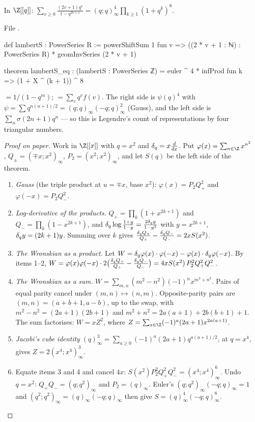 \begin{theorem}\label{l25:thm:legendre}
In $\Z[[q]]$: $\displaystyle\sum_{v\ge0}\frac{(2v+1)q^v}{1-q^{2v+1}}=(q;q)_\infty^4\prod_{k\ge1}(1+q^k)^8$.
\end{theorem}
\noindent File .
\begin{leancode}
def lambertS : PowerSeries R :=
  powerShiftSum 1 fun v => ((2 * v + 1 : ℕ) : PowerSeries R) * geomInvSeries (2 * v + 1)

theorem lambertS_eq :
    (lambertS : PowerSeries ℤ) = euler ^ 4 * infProd fun k => (1 + X ^ (k + 1)) ^ 8
\end{leancode}
\begin{dictionary}
 $=1/(1-q^m)$;  $=\sum_vq^vf(v)$. The right side is
$\psi(q)^4$ with $\psi=\sum q^{n(n+1)/2}=(q;q)_\infty(-q;q)_\infty^2$ (Gauss), and the left side is
$\sum_n\sigma(2n+1)q^n$ --- so this is Legendre's count of representations by four triangular numbers.
\end{dictionary}
\begin{proof}[Proof on paper]
Work in $\Z[[x]]$ with $q=x^2$ and $\delta_q=x\frac d{dx}$. Put $\varphi(x)=\sum_{n\in\Z}x^{n^2}$,
$Q_\pm=(\mp x;x^2)_\infty$, $P_2=(x^2;x^2)_\infty$, and let $S(q)$ be the left side of the theorem.
\begin{enumerate}
\item \emph{Gauss} (the triple product at $u=\mp x$, base $x^2$): $\varphi(x)=P_2Q_+^2$ and $\varphi(-x)=P_2Q_-^2$.
\item \emph{Log-derivative of the products.} $Q_+=\prod_k(1+x^{2k+1})$ and $Q_-=\prod_k(1-x^{2k+1})$, and
  $\delta_q\log\frac{1+y}{1-y}=\frac{2\delta_q y}{1-y^2}$ with $y=x^{2k+1}$, $\delta_q y=(2k+1)y$.
  Summing over $k$ gives $\frac{\delta_q Q_+}{Q_+}-\frac{\delta_q Q_-}{Q_-}=2xS(x^2)$.
\item \emph{The Wronskian as a product.} Let $W=\delta_q\varphi(x)\cdot\varphi(-x)-\varphi(x)\cdot\delta_q\varphi(-x)$.
  By items 1--2, $W=\varphi(x)\varphi(-x)\cdot2\big(\frac{\delta_q Q_+}{Q_+}-\frac{\delta_q Q_-}{Q_-}\big)
  =4xS(x^2)\,P_2^2Q_+^2Q_-^2$.
\item \emph{The Wronskian as a sum.} $W=\sum_{m,n}(m^2-n^2)(-1)^nx^{m^2+n^2}$. Pairs of equal parity cancel under
  $(m,n)\mapsto(n,m)$. Opposite-parity pairs are $(m,n)=(a+b+1,a-b)$, up to the swap, with $m^2-n^2=(2a+1)(2b+1)$ and
  $m^2+n^2=2a(a+1)+2b(b+1)+1$. The sum factorises: $W=xZ^2$, where $Z=\sum_{a\in\Z}(-1)^a(2a+1)x^{2a(a+1)}$.
\item \emph{Jacobi's cube identity} $(q)_\infty^3=\sum_{a\ge0}(-1)^a(2a+1)q^{a(a+1)/2}$, at $q=x^4$, gives $Z=2(x^4;x^4)_\infty^3$.
\item Equate items 3 and 4 and cancel $4x$: $S(x^2)P_2^2Q_+^2Q_-^2=(x^4;x^4)^6_\infty$. Undo $q=x^2$: $Q_+Q_-=(q;q^2)_\infty$
  and $P_2=(q)_\infty$. Euler's $(q;q^2)_\infty(-q;q)_\infty=1$ and $(q^2;q^2)_\infty=(q)_\infty(-q;q)_\infty$ then give
  $S=(q)_\infty^4(-q;q)_\infty^8$.
\end{enumerate}
\end{proof}
